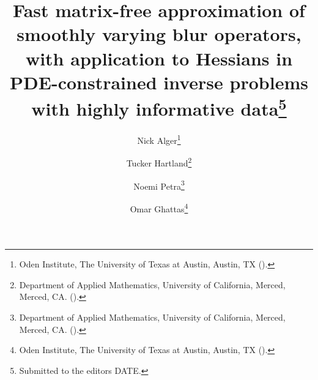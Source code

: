 

\usepackage{lipsum}
\usepackage{amsfonts}
\usepackage{graphicx}
\usepackage{epstopdf}
\usepackage{amsmath}
\usepackage[algo2e, ruled, noend, linesnumbered]{algorithm2e}
\ifpdf
\else
\fi

\newcommand{\creflastconjunction}{, and~}
\newcommand{\nor}[1]{\left\|#1\right\|}



\newcommand{\norm}[1]{\|#1\|}



\title{Fast matrix-free approximation of smoothly varying blur operators, with application to Hessians in PDE-constrained inverse problems with highly informative data\thanks{Submitted to the editors DATE.
}}

\author{Nick Alger\thanks{Oden Institute, The University of Texas at Austin, Austin, TX 
  ().}
\and Tucker Hartland\thanks{Department of Applied Mathematics, University of California, Merced, Merced, CA. 
	().}
\and Noemi Petra\thanks{Department of Applied Mathematics, University of California, Merced, Merced, CA. 
  ().}
\and Omar Ghattas\thanks{Oden Institute, The University of Texas at Austin, Austin, TX 
	().}}

\newcommand{\Aop}{\mathcal{A}}
\newcommand{\AopPc}{\mathcal{A}_\text{pc}}
\newcommand{\AopPcMesh}{\mathcal{A}_\text{pc}^h}

